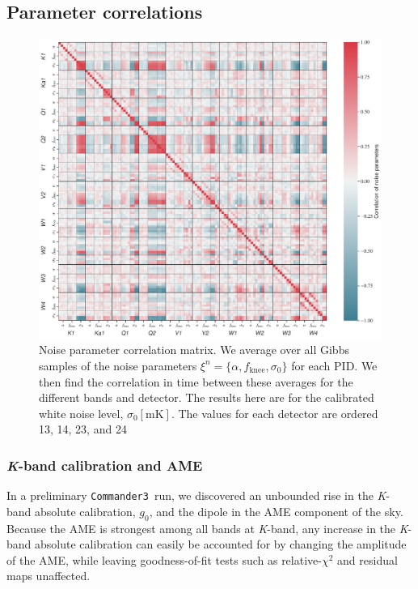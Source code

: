 \documentclass[twocolumn]{../../common/aa}
\def\commanderthree{\texttt{Commander3}}
\newcommand{\K}[0]{\textit K}
\begin{document}
\subsection{Parameter correlations}
\label{sec:correlations}

\begin{figure}[t]
	\centering
	\includegraphics[width=\textwidth]{figures/noise_parameter_correlation.pdf}
	\caption{Noise parameter correlation matrix. We average over all Gibbs samples of the noise parameters $\xi^n=\{\alpha,f_\mathrm{knee},\sigma_0\}$ for each PID. We then find the correlation in time between these averages for the different bands and detector. The results here are for the calibrated white noise level, $\sigma_0[\mathrm{mK}]$. The values for each detector are ordered 13, 14, 23, and 24}
	\label{fig:correlation}
\end{figure}

\lipsum[5]

\subsubsection{\K-band calibration and AME}
\label{sec:kband_correlation}

In a preliminary \commanderthree\ run, we discovered an unbounded rise in the
\K-band absolute calibration, $g_0$, and the dipole in the AME component of the sky. Because the AME is strongest among all bands at \K-band, any increase in the \K-band absolute calibration can easily be accounted for by changing the amplitude of the AME, while leaving goodness-of-fit tests such as relative-$\chi^2$ and residual maps unaffected.
\end{document}
